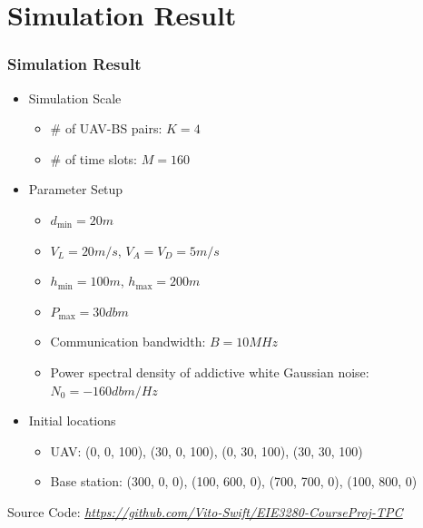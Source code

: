 \documentclass[11.5pt]{beamer}
\begin{document}
\section{Simulation Result}
\begin{frame}
	\frametitle{Simulation Result}
	
	\begin{itemize}
		\item<1-> Simulation Scale
		\begin{itemize}
			\item \# of UAV-BS pairs: $K = 4$
			\item \# of time slots: $M = 160$
		\end{itemize}
		\item<2-> Parameter Setup
		\begin{itemize}
			\item $d_{\text{min}} = 20 m$
			\item $V_L = 20 m/s$, $V_A = V_D = 5 m/s$ 
			\item $h_{\text{min}} = 100m$, $h_{\text{max}} = 200m$
			\item $P_{\text{max}} = 30dbm$
			\item Communication bandwidth: $B = 10 MHz$
			\item Power spectral density of addictive white Gaussian noise: $N_0 = -160 dbm/Hz$
		\end{itemize}
		\item<3-> Initial locations
		\begin{itemize}
			\item UAV: (0, 0, 100), (30, 0, 100), (0, 30, 100), (30, 30, 100)
			\item Base station: (300, 0, 0), (100, 600, 0), (700, 700, 0), (100, 800, 0)
		\end{itemize}
	\end{itemize}
	\quad \quad \scriptsize Source Code: \href{https://github.com/Vito-Swift/EIE3280-CourseProj-TPC}{\underline{\textit{https://github.com/Vito-Swift/EIE3280-CourseProj-TPC}}}\\
\end{frame}
\end{document}
